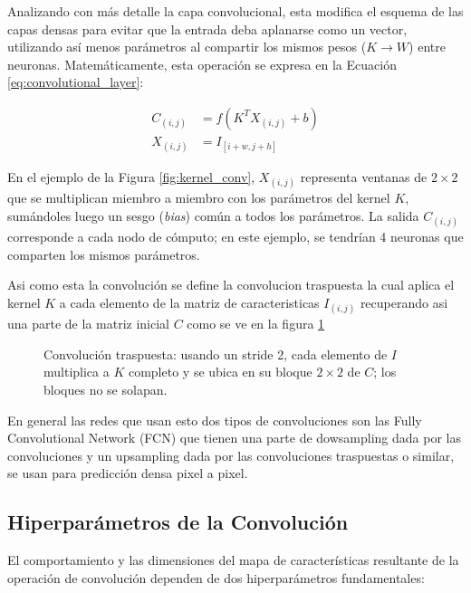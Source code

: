 Analizando con más detalle la capa convolucional, esta modifica el esquema de las capas densas para evitar que la entrada deba aplanarse como un vector, utilizando así menos parámetros al compartir los mismos pesos ($K \rightarrow W$) entre neuronas. Matemáticamente, esta operación se expresa en la Ecuación \ref{eq:convolutional_layer}:

\begin{align}
    C_{(i,j)} &= f(K^T X_{(i,j)} + b)
    \label{eq:convolutional_layer}
    \\
    X_{(i,j)} &= I_{[i+w,j+h]}
\end{align}

En el ejemplo de la Figura \ref{fig:kernel_conv}, $X_{(i,j)}$ representa ventanas de $2 \times 2$ que se multiplican miembro a miembro con los parámetros del kernel $K$, sumándoles luego un sesgo (\textit{bias}) común a todos los parámetros. La salida $C_{(i,j)}$ corresponde a cada nodo de cómputo; en este ejemplo, se tendrían 4 neuronas que comparten los mismos parámetros.


Asi como esta la convolución se define la convolucion traspuesta la cual aplica el kernel $K$ a cada elemento de la matriz de caracteristicas $I_{(i,j)}$ recuperando asi una parte de la matriz inicial $C$ como se ve en la figura \ref{fig:conv_traspuesta}


\begin{figure}[H]
    \centering
    \resizebox{0.76\textwidth}{!}{%
    }%
    \caption{Convolución traspuesta: usando un stride 2, cada elemento de $I$ multiplica a $K$ completo y se ubica en su bloque $2{\times}2$ de $C$; los bloques no se solapan.}
    \label{fig:conv_traspuesta}
\end{figure}


En general las redes que usan esto dos tipos de convoluciones son las Fully Convolutional Network (FCN) que tienen una parte de dowsampling dada por las convoluciones y un upsampling dada por las convoluciones traspuestas o similar, se usan para predicción densa pixel a pixel.


\subsection{Hiperparámetros de la Convolución}

El comportamiento y las dimensiones del mapa de características resultante de la operación de convolución dependen de dos hiperparámetros fundamentales:

